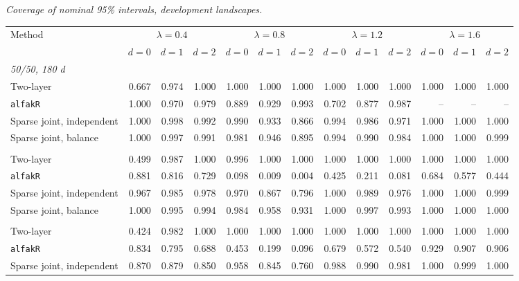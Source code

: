 \noindent\textit{Coverage of nominal 95\% intervals, development landscapes.}
\begin{center}
\scriptsize
\setlength{\tabcolsep}{2.5pt}
\begin{tabular}{l*{12}{r}}
\toprule
Method & \multicolumn{3}{c}{$\lambda=0.4$} & \multicolumn{3}{c}{$\lambda=0.8$} & \multicolumn{3}{c}{$\lambda=1.2$} & \multicolumn{3}{c}{$\lambda=1.6$} \\
\cmidrule(lr){2-4}\cmidrule(lr){5-7}\cmidrule(lr){8-10}\cmidrule(lr){11-13}
 & $d=0$ & $d=1$ & $d=2$ & $d=0$ & $d=1$ & $d=2$ & $d=0$ & $d=1$ & $d=2$ & $d=0$ & $d=1$ & $d=2$ \\
\midrule
\multicolumn{13}{l}{\textit{50/50, 180 d}} \\
\quad Two-layer & 0.667 & 0.974 & 1.000 & 1.000 & 1.000 & 1.000 & 1.000 & 1.000 & 1.000 & 1.000 & 1.000 & 1.000 \\
\quad \texttt{alfakR} & 1.000 & 0.970 & 0.979 & 0.889 & 0.929 & 0.993 & 0.702 & 0.877 & 0.987 & -- & -- & -- \\
\quad Sparse joint, independent & 1.000 & 0.998 & 0.992 & 0.990 & 0.933 & 0.866 & 0.994 & 0.986 & 0.971 & 1.000 & 1.000 & 1.000 \\
\quad Sparse joint, balance & 1.000 & 0.997 & 0.991 & 0.981 & 0.946 & 0.895 & 0.994 & 0.990 & 0.984 & 1.000 & 1.000 & 0.999 \\
\addlinespace[2pt]
\multicolumn{13}{l}{\textit{200/200, 180 d}} \\
\quad Two-layer & 0.499 & 0.987 & 1.000 & 0.996 & 1.000 & 1.000 & 1.000 & 1.000 & 1.000 & 1.000 & 1.000 & 1.000 \\
\quad \texttt{alfakR} & 0.881 & 0.816 & 0.729 & 0.098 & 0.009 & 0.004 & 0.425 & 0.211 & 0.081 & 0.684 & 0.577 & 0.444 \\
\quad Sparse joint, independent & 0.967 & 0.985 & 0.978 & 0.970 & 0.867 & 0.796 & 1.000 & 0.989 & 0.976 & 1.000 & 1.000 & 0.999 \\
\quad Sparse joint, balance & 1.000 & 0.995 & 0.994 & 0.984 & 0.958 & 0.931 & 1.000 & 0.997 & 0.993 & 1.000 & 1.000 & 1.000 \\
\addlinespace[2pt]
\multicolumn{13}{l}{\textit{200/200, 360 d}} \\
\quad Two-layer & 0.424 & 0.982 & 1.000 & 1.000 & 1.000 & 1.000 & 1.000 & 1.000 & 1.000 & 1.000 & 1.000 & 1.000 \\
\quad \texttt{alfakR} & 0.834 & 0.795 & 0.688 & 0.453 & 0.199 & 0.096 & 0.679 & 0.572 & 0.540 & 0.929 & 0.907 & 0.906 \\
\quad Sparse joint, independent & 0.870 & 0.879 & 0.850 & 0.958 & 0.845 & 0.760 & 0.988 & 0.990 & 0.981 & 1.000 & 0.999 & 1.000 \\

\end{tabular}
\end{center}
